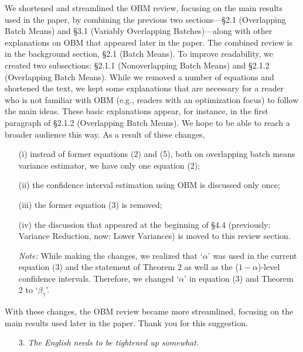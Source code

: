 \documentclass[11pt,notitlepage,onecolumn]{article}
\newcommand{\noi}{\noindent}
\begin{document}
\noindent 
We shortened and streamlined the OBM review, focusing on the main results used in the paper, by combining the previous two sections---\S 2.1 (Overlapping Batch Means) and \S 3.1 (Variably Overlapping Batches)---along with other explanations on OBM that appeared later in the paper. 
The combined review is in the background section, \S 2.1 (Batch Means). 
To improve readability, we created two subsections: \S 2.1.1 (Nonoverlapping Batch Means) and \S 2.1.2 (Overlapping Batch Means). 
While we removed a number of equations and shortened the text, we kept some explanations that are necessary for a reader who is not familiar with OBM (e.g., readers with an optimization focus) to follow the main ideas. 
These basic explanations appear, for instance, in the first paragraph of \S 2.1.2 (Overlapping Batch Means).  
We hope to be able to reach a broader audience this way. 
As a result of these changes, 
\begin{itemize}
	\item[(i)]  instead of former equations (2) and (5), both on overlapping batch means variance estimator, we have only one equation (2); 
	
	\item[(ii)]  the confidence interval estimation using OBM is discussed only once;

	\item[(iii)] the former equation (3) is removed;

	\item[(iv)] the discussion that appeared at the beginning of \S 4.4 (previously: Variance Reduction, now: Lower Variances) is moved to this review section.\medskip 

{\it Note:} While making the changes, we realized that `$\alpha$' was used in the current equation (3) and the statement of Theorem 2 as well as the ($1-\alpha$)-level confidence intervals.  
Therefore, we changed `$\alpha$' in equation (3) and Theorem 2 to `$\beta_{\bar{\gamma}}$'. 
\end{itemize}

\noi
With these changes, the OBM review became more streamlined, focusing on the main results used later in the paper. 
Thank you for this suggestion.


\bigskip 

\begin{itemize}
\item[3.] \textit{The English needs to be tightened up somewhat.}
\end{itemize}
\end{document}
